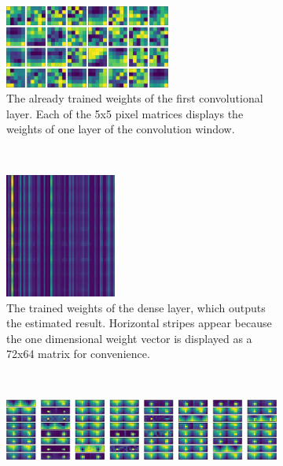 \newpage

\begin{figure}[h!]
	\centering
	\begin{subfigure}[t]{\textwidth}
		\centering
		\includegraphics[width=0.6\textwidth]{img/implementation_neuralNetwork_structureOfOurNeuralNetwork_conv2D_1.png}
		\caption{The already trained weights of the first convolutional layer. Each of the 5x5 pixel matrices displays the weights of one layer of the convolution window.}
		\label{pic:implementation_neuralNetwork_structureOfOurNeuralNetwork_weights_a}
	\end{subfigure}
	~
	\begin{subfigure}[t]{\textwidth}
		\centering
		\includegraphics[width=0.4\textwidth]{img/implementation_neuralNetwork_structureOfOurNeuralNetwork_dense_1.png}
		\caption{The trained weights of the dense layer, which outputs the estimated result. Horizontal stripes appear because the one dimensional weight vector is displayed as a 72x64 matrix for convenience.}
		\label{pic:implementation_neuralNetwork_structureOfOurNeuralNetwork_weights_c}
	\end{subfigure}
	~
	\begin{subfigure}[t]{\textwidth}
		\centering
		\includegraphics[width=\textwidth]{img/implementation_neuralNetwork_structureOfOurNeuralNetwork_dense_1b.png}

\end{subfigure}
\end{figure}
